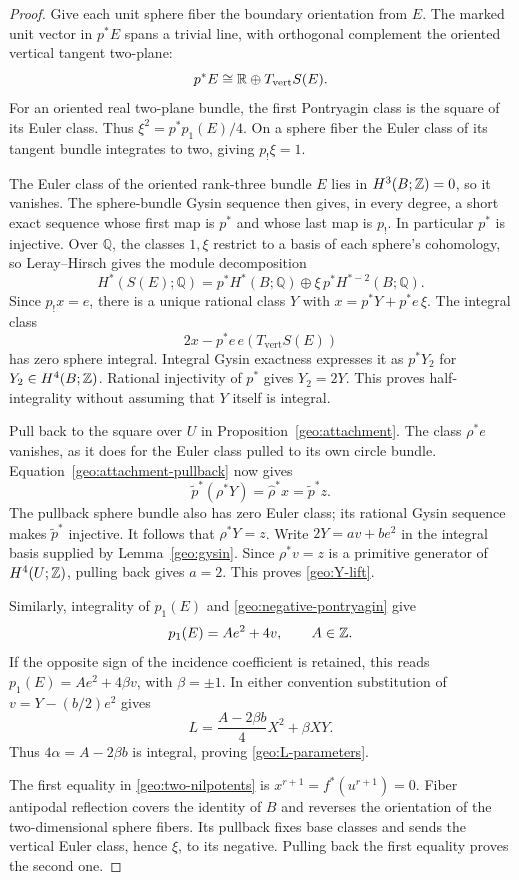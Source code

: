 \begin{proof}
Give each unit sphere fiber the boundary orientation from $E$.
The marked unit vector in $p^*E$ spans a trivial line, with
orthogonal complement the oriented vertical tangent two-plane:
\[
 p^*E\cong\mathbb R\oplus T_{\mathrm{vert}}S(E).
\]
For an oriented real two-plane bundle, the first Pontryagin
class is the square of its Euler class.  Thus
$\xi^2=p^*p_1(E)/4$.  On a sphere fiber the Euler class of
its tangent bundle integrates to two, giving $p_!\xi=1$.

The Euler class of the oriented rank-three bundle $E$ lies in
$H^3(B;\mathbb Z)=0$, so it vanishes.  The sphere-bundle Gysin
sequence then gives, in every degree, a short exact sequence
whose first map is $p^*$ and whose last map is $p_!$.
In particular $p^*$ is injective.  Over $\mathbb Q$, the
classes $1,\xi$ restrict to a basis of each sphere's cohomology,
so Leray--Hirsch gives the module decomposition
\[
 H^*(S(E);\mathbb Q)
 =p^*H^*(B;\mathbb Q)
  \oplus\xi\,p^*H^{*-2}(B;\mathbb Q).
\]
Since $p_!x=e$, there is a unique rational class $Y$ with
$x=p^*Y+p^*e\,\xi$.
The integral class
\[
 2x-p^*e\,e(T_{\mathrm{vert}}S(E))
\]
has zero sphere integral.  Integral Gysin exactness expresses
it as $p^*Y_2$ for $Y_2\in H^4(B;\mathbb Z)$.  Rational injectivity
of $p^*$ gives $Y_2=2Y$.  This proves half-integrality without
assuming that $Y$ itself is integral.

Pull back to the square over $U$ in
Proposition~\ref{geo:attachment}.  The class $\rho^*e$ vanishes,
as it does for the Euler class pulled to its own circle bundle.
Equation~\eqref{geo:attachment-pullback} now gives
\[
 \widetilde p^*(\rho^*Y)=\widehat\rho^*x
 =\widetilde p^*z.
\]
The pullback sphere bundle also has zero Euler class; its
rational Gysin sequence makes $\widetilde p^*$ injective.
It follows that $\rho^*Y=z$.
Write $2Y=a v+b e^2$ in the integral basis supplied by
Lemma~\ref{geo:gysin}.  Since $\rho^*v=z$ is a primitive
generator of $H^4(U;\mathbb Z)$, pulling back gives $a=2$.
This proves \eqref{geo:Y-lift}.

Similarly, integrality of $p_1(E)$ and
\eqref{geo:negative-pontryagin} give
\[
 p_1(E)=A e^2+4v,\qquad A\in\mathbb Z.
\]
If the opposite sign of the incidence coefficient is retained,
this reads $p_1(E)=A e^2+4\beta v$, with $\beta=\pm1$.
In either convention substitution of
$v=Y-(b/2)e^2$ gives
\[
 L=\frac{A-2\beta b}{4}X^2+\beta XY.
\]
Thus $4\alpha=A-2\beta b$ is integral, proving
\eqref{geo:L-parameters}.

The first equality in \eqref{geo:two-nilpotents} is
$x^{r+1}=f^*(u^{r+1})=0$.  Fiber antipodal reflection covers
the identity of $B$ and reverses the orientation of the
two-dimensional sphere fibers.  Its pullback fixes base classes
and sends the vertical Euler class, hence $\xi$, to its negative.
Pulling back the first equality proves the second one.


\end{proof}
